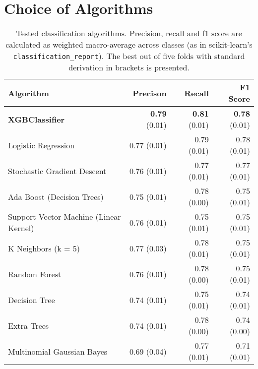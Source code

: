 \section{Choice of Algorithms}
\begin{table}[!h]
\centering
\label{tbl:algo}
\caption{Tested classification algorithms. Precision, recall and f1 score are calculated as weighted macro-average across classes (as in scikit-learn's \texttt{classification\_report}). The best out of five folds with standard derivation in brackets is presented.}
\begin{tabularx}{\textwidth}{Xrrr}
\toprule
Algorithm & Precison & Recall & F1 Score \\ \midrule
\textbf{XGBClassifier} 	&	 \textbf{0.79} \scriptsize{(0.01)} &  \textbf{0.81} \scriptsize{(0.01)} &  \textbf{0.78} \scriptsize{(0.01)}  \\

Logistic Regression 	&	 0.77 \scriptsize{(0.01)} &	 0.79 \scriptsize{(0.01)} &	 0.78 \scriptsize{(0.01)}  \\ 


Stochastic Gradient Descent 	&	 0.76 \scriptsize{(0.01)} &	 0.77 \scriptsize{(0.01)} &	 0.77 \scriptsize{(0.01)}  \\ 

Ada Boost (Decision Trees) 	&	 0.75 \scriptsize{(0.01)} &	 0.78 \scriptsize{(0.00)} &	 0.75 \scriptsize{(0.01)}  \\ 

Support Vector Machine (Linear Kernel) &	 0.76 \scriptsize{(0.01)} &	 0.75 \scriptsize{(0.01)} &	 0.75 \scriptsize{(0.01)}  \\ 


K Neighbors (k = 5) &	 0.77 \scriptsize{(0.03)} &	 0.78 \scriptsize{(0.01)} &	 0.75 \scriptsize{(0.01)}  \\ 


Random Forest &	 0.76 \scriptsize{(0.01)} &	 0.78 \scriptsize{(0.00)} &	 0.75 \scriptsize{(0.01)}  \\ 

Decision Tree &	 0.74 \scriptsize{(0.01)} &	 0.75 \scriptsize{(0.01)} &	 0.74 \scriptsize{(0.01)}  \\ 

Extra Trees 	&	 0.74 \scriptsize{(0.01)} &	 0.78 \scriptsize{(0.00)} &	 0.74 \scriptsize{(0.00)}  \\ 

Multinomial Gaussian Bayes &	 0.69 \scriptsize{(0.04)} &	 0.77 \scriptsize{(0.01)} &	 0.71 \scriptsize{(0.01)}  \\ 



\end{tabularx}
\end{table}
